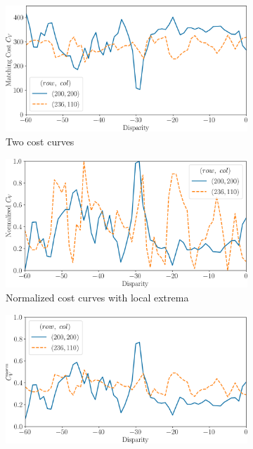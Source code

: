 \begin{figure}
    \centering
    \begin{subfigure}[t]{0.47\linewidth}
        \centering
        \includegraphics[width=\linewidth]{Images/Chap_5/cost_curve_not_normalized.png}
        \caption{Two cost curves}
        \label{fig:cost_curves_a}
    \end{subfigure}\hfill
    \begin{subfigure}[t]{0.47\linewidth}
        \centering
        \includegraphics[width=\linewidth]{Images/Chap_5/cost_curve_bad_normalized.png}
        \caption{Normalized cost curves with local extrema}
        \label{fig:cost_curves_b}
    \end{subfigure}
    \begin{subfigure}[t]{0.47\linewidth}
        \centering
        \includegraphics[width=\linewidth]{Images/Chap_5/cost_curve_normalized.png}

\end{subfigure}
\end{figure}
